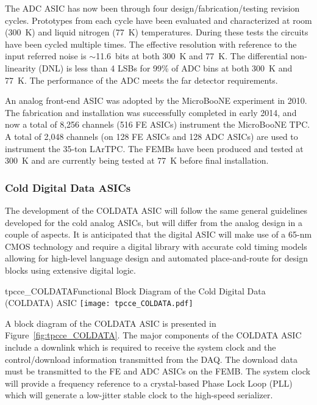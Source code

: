 The ADC ASIC has now been through four design/fabrication/testing revision cycles.
Prototypes from each cycle have been evaluated and characterized at room (300~K) and liquid nitrogen (77~K) temperatures.
During these tests the circuits have been cycled multiple times.
The effective resolution with reference to the input referred noise is $\sim$11.6~bits at both 300~K and 77~K.
The differential non-linearity (DNL) is less than 4 LSBs for 99\% of ADC bins at both 300~K and 77~K.
The performance of the ADC meets the far detector requirements.

An analog front-end ASIC was adopted by the MicroBooNE experiment in 2010.\cite{microboone-url}
The fabrication and installation was successfully completed in early 2014, and now 
a total of 8,256 channels (516 FE ASICs) instrument the MicroBooNE TPC. 
A total of 2,048 channels (on 128 FE ASICs and 128 ADC ASICs) are used to instrument the 35-ton 
LArTPC.
The FEMBs have been produced and tested at 300~K and are currently
being tested at 77~K before final installation. %


%
\subsubsection{Cold Digital Data ASICs}
\label{subsubsec:fe_CMOS_digital}

The development of the COLDATA ASIC will follow the same general guidelines developed for the cold analog ASICs, but
will differ from the analog design in a couple of aspects.
It is anticipated that the digital ASIC will make use of a 65-nm CMOS technology and require a
digital library with accurate cold timing models allowing for high-level language design and
automated place-and-route for design blocks using extensive digital logic.

\begin{cdrfigure}{tpcce_COLDATA}{Functional Block Diagram of the Cold Digital Data (COLDATA) ASIC}
\texttt{[image: tpcce\_COLDATA.pdf]}
\end{cdrfigure}

A block diagram of the COLDATA ASIC is presented in Figure~\ref{fig:tpcce_COLDATA}.
The major components of the COLDATA ASIC include a downlink which is required to receive the system clock and
the control/download information transmitted from the DAQ.
The download data must be transmitted to the FE and ADC ASICs on the FEMB.
The system clock will provide a frequency reference to a crystal-based Phase Lock Loop (PLL)
which will generate a low-jitter stable clock to the high-speed serializer.

